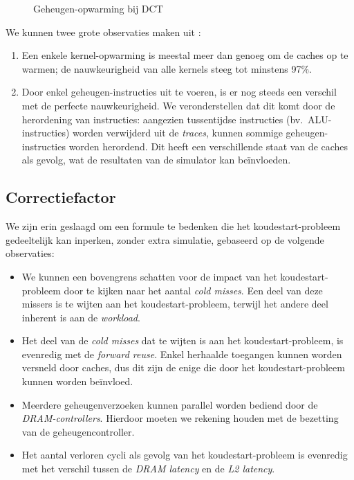 \documentclass[5p,numvwe]{elsarticle}
\begin{document}
    \begin{figure}
        \centering
        \caption{Geheugen-opwarming bij DCT}
        \label{fig:mitig-dct}
    \end{figure}

    We kunnen twee grote observaties maken uit :
    \begin{enumerate}
        \item Een enkele kernel-opwarming is meestal meer dan genoeg om de caches op te warmen; de nauwkeurigheid van alle kernels steeg tot minstens 97\%.
        \item Door enkel geheugen-instructies uit te voeren, is er nog steeds een verschil met de perfecte nauwkeurigheid.
        We veronderstellen dat dit komt door de herordening van instructies: aangezien tussentijdse instructies (bv.\ ALU-instructies) worden verwijderd uit de \textit{traces}, kunnen sommige geheugen-instructies worden herordend.
        Dit heeft een verschillende staat van de caches als gevolg, wat de resultaten van de simulator kan beïnvloeden.
    \end{enumerate}

    \subsection{Correctiefactor}\label{subsec:inp-corr}
    We zijn erin geslaagd om een formule te bedenken die het koudestart-probleem gedeeltelijk kan inperken, zonder extra simulatie, gebaseerd op de volgende observaties:
    \begin{itemize}
        \item We kunnen een bovengrens schatten voor de impact van het koudestart-probleem door te kijken naar het aantal \textit{cold misses}.
        Een deel van deze missers is te wijten aan het koudestart-probleem, terwijl het andere deel inherent is aan de \textit{workload}.
        \item Het deel van de \textit{cold misses} dat te wijten is aan het koudestart-probleem, is evenredig met de \textit{forward reuse}.
        Enkel herhaalde toegangen kunnen worden versneld door caches, dus dit zijn de enige die door het koudestart-probleem kunnen worden beïnvloed.
        \item Meerdere geheugenverzoeken kunnen parallel worden bediend door de \textit{DRAM-controllers}.
        Hierdoor moeten we rekening houden met de bezetting van de geheugencontroller.
        \item Het aantal verloren cycli als gevolg van het koudestart-probleem is evenredig met het verschil tussen de \textit{DRAM latency} en de \textit{L2 latency}.
    \end{itemize}
\end{document}
